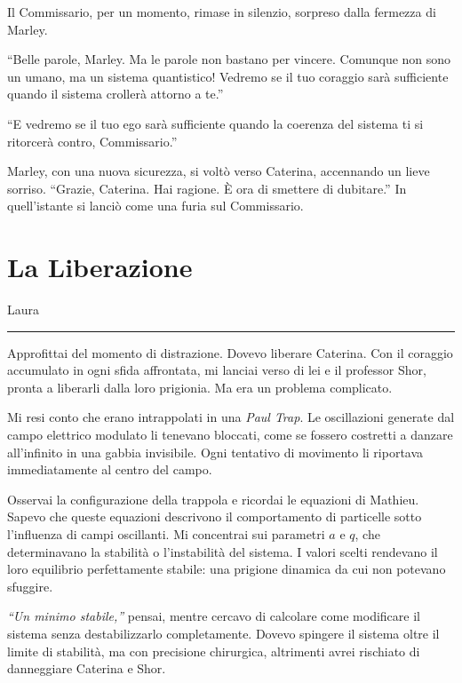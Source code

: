 \begin{dialogue}
Il Commissario, per un momento, rimase in silenzio, sorpreso dalla fermezza di Marley.

 \enquote{Belle parole, Marley. Ma le parole non bastano per vincere. Comunque non sono un umano, ma un sistema quantistico! Vedremo se il tuo coraggio sarà sufficiente quando il sistema crollerà attorno a te.}

 \enquote{E vedremo se il tuo ego sarà sufficiente quando la coerenza del sistema ti si ritorcerà contro, Commissario.}

Marley, con una nuova sicurezza, si voltò verso Caterina, accennando un lieve sorriso. \enquote{Grazie, Caterina. Hai ragione. È ora di smettere di dubitare.}
In quell'istante si lanciò come una furia sul Commissario.

\end{dialogue}

  

\section{La Liberazione}

\vspace{1em}
\begin{center}Laura\end{center}
\hrule
\vspace{1em}


Approfittai del momento di distrazione. Dovevo liberare Caterina. Con il coraggio accumulato in ogni sfida affrontata, mi lanciai verso di lei e il professor Shor, pronta a liberarli dalla loro prigionia. Ma era un problema complicato.

Mi resi conto che erano intrappolati in una \textit{Paul Trap}. Le oscillazioni generate dal campo elettrico modulato li tenevano bloccati, come se fossero costretti a danzare all'infinito in una gabbia invisibile. Ogni tentativo di movimento li riportava immediatamente al centro del campo.


Osservai la configurazione della trappola e ricordai le equazioni di Mathieu. Sapevo che queste equazioni descrivono il comportamento di particelle sotto l’influenza di campi oscillanti. Mi concentrai sui parametri \(a\) e \(q\), che determinavano la stabilità o l’instabilità del sistema. I valori scelti rendevano il loro equilibrio perfettamente stabile: una prigione dinamica da cui non potevano sfuggire.

\textit{“Un minimo stabile,”} pensai, mentre cercavo di calcolare come modificare il sistema senza destabilizzarlo completamente. Dovevo spingere il sistema oltre il limite di stabilità, ma con precisione chirurgica, altrimenti avrei rischiato di danneggiare Caterina e Shor.

